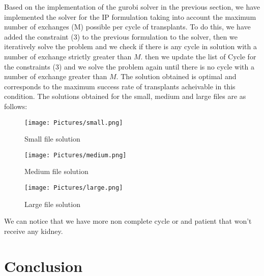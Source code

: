 \documentclass{ULBreport}
\begin{document}
Based on the implementation of the gurobi solver in the previous section, we have implemented the solver for the IP formulation taking into account the maximum number of exchanges (M) possible per cycle of transplants. To do this, we have added the constraint (3) to the previous formulation to the solver, then we iteratively solve the problem and we check if there is any cycle in solution with a number of exchange  strictly greater than $M$. then we update the list of Cycle for the constraints (3) and we solve the problem again until there is no cycle with a number of exchange greater than $M$. The solution obtained is optimal and corresponds to the maximum success rate of transplants acheivable in this condition. The solutions obtained for the small, medium and large files are as follows:
\begin{figure}[h]
  \centering
  \begin{minipage}{0.32\textwidth}
    \centering
    \texttt{[image: Pictures/small.png]}
    \caption{Small file solution}
    \label{fig:small}
  \end{minipage}\hfill
  \begin{minipage}{0.32\textwidth}
    \centering
    \texttt{[image: Pictures/medium.png]}
    \caption{Medium file solution}
    \label{fig:medium}
  \end{minipage}\hfill
  \begin{minipage}{0.32\textwidth}
    \centering
    \texttt{[image: Pictures/large.png]}
    \caption{Large file solution}
    \label{fig:large}
  \end{minipage}
\end{figure}


We can notice that we have more non complete cycle or and patient that won't receive any kidney. 

\chapter{Conclusion}
\end{document}

